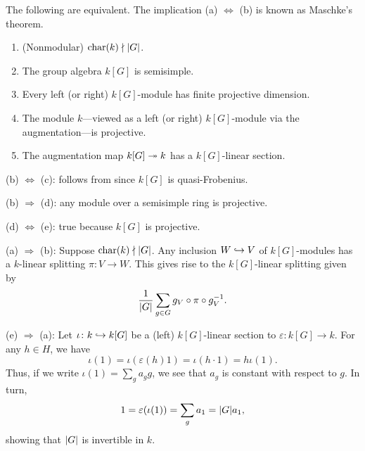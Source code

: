 \documentclass[12pt]{article}
\begin{document}
\begin{thm}
	The following are equivalent. The implication (a) $\Leftrightarrow$ (b) is known as Maschke's theorem.
	\begin{enumerate}[label=(\alph*)]
		\item (Nonmodular) $\operatorname{char}(k) \nmid {\left\lvert G \right\lvert}$.
		\item The group algebra $k[G]$ is semisimple.
		\item Every left (or right) $k[G]$-module has finite projective dimension.
		\item The module $k$---viewed as a left (or right) $k[G]$-module via the augmentation---is projective.
		\item The augmentation map $k[G] \twoheadrightarrow k$ has a $k[G]$-linear section.
	\end{enumerate}
\end{thm}
\begin{sketch}

	(b) $\Leftrightarrow$ (c): follows from  since $k[G]$ is quasi-Frobenius.

	(b) $\Rightarrow$ (d): any module over a semisimple ring is projective.

	(d) $\Leftrightarrow$ (e): true because $k[G]$ is projective.

	(a) $\Rightarrow$ (b): Suppose $\operatorname{char}(k) \nmid {\left\lvert G \right\lvert}$. 
	Any inclusion $W \hookrightarrow V$ of $k[G]$-modules has a $k$-linear splitting $\pi \colon V \to W$. 
	This gives rise to the $k[G]$-linear splitting given by 
	\begin{equation*} 
		\frac{1}{{\left\lvert G \right\lvert}} \sum_{g \in G} g_{V} \circ \pi \circ g_{V}^{-1}.
	\end{equation*} 

	(e) $\Rightarrow$ (a): Let $\iota \colon k \hookrightarrow k[G]$ be a (left) $k[G]$-linear section to $\varepsilon \colon k[G] \to k$. 
	For any $h \in H$, we have 
	\begin{equation*} 
		\iota(1) = \iota(\varepsilon(h) 1) = \iota(h \cdot 1) = h \iota(1).
	\end{equation*}
	Thus, if we write $\iota(1) = \sum_{g} a_{g} g$, we see that $a_{g}$ is constant with respect to $g$. 
	In turn,
	\begin{equation*} 
		1 = \varepsilon(\iota(1)) = \sum_{g} a_{1} = {\left\lvert G \right\lvert} a_{1},
	\end{equation*}
	showing that ${\left\lvert G \right\lvert}$ is invertible in $k$.
\end{sketch}
\end{document}
